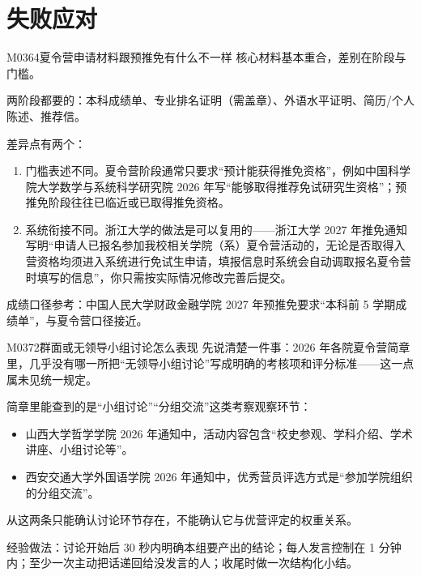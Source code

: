 \section{失败应对}
\begin{qa}{M0364}{夏令营申请材料跟预推免有什么不一样}
核心材料基本重合，差别在阶段与门槛。

两阶段都要的：本科成绩单、专业排名证明（需盖章）、外语水平证明、简历/个人陈述、推荐信。

差异点有两个：
\begin{enumerate}
  \item 门槛表述不同。夏令营阶段通常只要求“预计能获得推免资格”，例如中国科学院大学数学与系统科学研究院 2026 年写“能够取得推荐免试研究生资格”；预推免阶段往往已临近或已取得推免资格。
  \item 系统衔接不同。浙江大学的做法是可以复用的——浙江大学 2027 年推免通知写明“申请人已报名参加我校相关学院（系）夏令营活动的，无论是否取得入营资格均须进入系统进行免试生申请，填报信息时系统会自动调取报名夏令营时填写的信息”，你只需按实际情况修改完善后提交。
\end{enumerate}

成绩口径参考：中国人民大学财政金融学院 2027 年预推免要求“本科前 5 学期成绩单”，与夏令营口径接近。
\end{qa}

\begin{qa}{M0372}{群面或无领导小组讨论怎么表现}
先说清楚一件事：2026 年各院夏令营简章里，几乎没有哪一所把“无领导小组讨论”写成明确的考核项和评分标准——这一点属未见统一规定。

简章里能查到的是“小组讨论”“分组交流”这类考察观察环节：
\begin{itemize}
  \item 山西大学哲学学院 2026 年通知中，活动内容包含“校史参观、学科介绍、学术讲座、小组讨论等”。
  \item 西安交通大学外国语学院 2026 年通知中，优秀营员评选方式是“参加学院组织的分组交流”。
\end{itemize}

从这两条只能确认讨论环节存在，不能确认它与优营评定的权重关系。

经验做法：讨论开始后 30 秒内明确本组要产出的结论；每人发言控制在 1 分钟内；至少一次主动把话递回给没发言的人；收尾时做一次结构化小结。
\end{qa}

